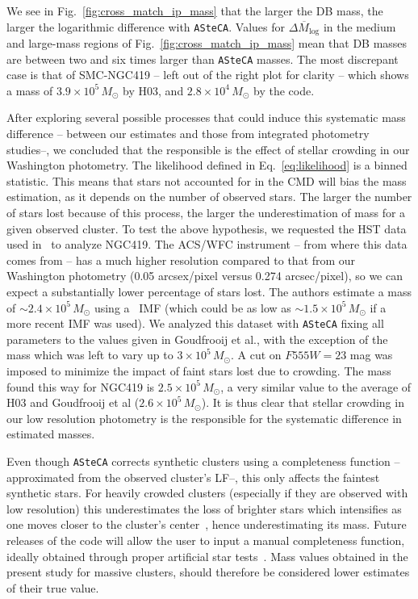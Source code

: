 \documentclass{aa}
\begin{document}
We see in Fig.~\ref{fig:cross_match_ip_mass} that
the larger the DB mass, the larger the logarithmic difference with
\texttt{ASteCA}. Values for $\overline{\Delta M_{\log}}$ in the medium and
large-mass regions of Fig.~\ref{fig:cross_match_ip_mass} mean that DB masses are
between two and six times larger than \texttt{ASteCA} masses.
%
The most discrepant case is that of SMC-NGC419 -- left out of
the right plot for clarity -- which shows a mass of $3.9{\times}10^5\,M_{\odot}$
by H03, and $2.8{\times}10^4\,M_{\odot}$ by the code.

After exploring several possible processes that could induce this systematic
mass difference -- between our estimates and those from integrated photometry
studies--, we concluded that the responsible is the effect of stellar crowding
in our Washington photometry.
%
The likelihood defined in Eq.~\ref{eq:likelihood} is a binned statistic. This
means that stars not accounted for in the CMD will bias the mass estimation,
as it depends on the number of observed stars. The larger the number of stars
lost because of this process, the larger the underestimation of mass for a given
observed cluster.
%
To test the above hypothesis, we requested the HST data used
in~\cite{Goudfrooij_2014} to analyze NGC419. The ACS/WFC instrument -- from
where this data comes from -- has a much higher resolution compared to that from
our Washington photometry (0.05 arcsex/pixel versus 0.274 arcsec/pixel), so we
can expect a substantially lower percentage of stars lost.
The authors estimate a mass of ${\sim}2.4{\times}10^5\,M_{\odot}$ using
a~\cite{Salpeter_1955} IMF (which could be as low as
${\sim}1.5{\times}10^5\,M_{\odot}$ if a more recent IMF was used).
We analyzed this dataset with \texttt{ASteCA} fixing all parameters to the
values given in Goudfrooij et al., with the exception of the
mass which was left to vary up to $3{\times}10^5\,M_{\odot}$. A cut on $F555W
{=}23$ mag was imposed to minimize the impact of faint stars lost due to
crowding.
%
The mass found this way for NGC419 is $2.5{\times}10^5\,M_{\odot}$, a
very similar value to the average of H03 and Goudfrooij et al
($2.6{\times}10^5\,M_{\odot}$).
%
It is thus clear that stellar crowding in our low resolution photometry is the
responsible for the systematic difference in estimated masses.

Even though \texttt{ASteCA} corrects synthetic clusters using a
completeness function -- approximated from the observed cluster's LF--, this
only affects the faintest synthetic stars. For heavily crowded clusters 
(especially if they are observed with low resolution) this underestimates the
loss of brighter stars which intensifies as one moves closer to the
cluster's center~\citep{Mateo_1988}, hence underestimating its mass.
Future releases of the code will allow the user to input a manual
completeness function, ideally obtained through proper artificial star
tests~\citep[see e.g.,][]{Aparicio_Gallart_1995}.
%
Mass values obtained in the present study for massive clusters, should therefore
be considered lower estimates of their true value.
\end{document}
